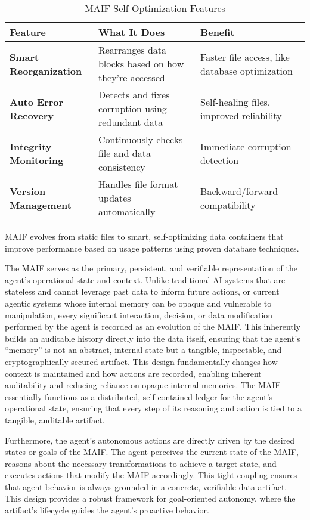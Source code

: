 \documentclass[conference]{IEEEtran}
\begin{document}
\begin{table*}[!t]
\renewcommand{\arraystretch}{1.3}
\caption{MAIF Self-Optimization Features}
\label{tab:self-optimization}
\centering
\footnotesize
\begin{tabular}{p{3.5cm}p{5cm}p{4.5cm}}
\toprule
\textbf{Feature} & \textbf{What It Does} & \textbf{Benefit} \\
\midrule
\textbf{Smart Reorganization} & Rearranges data blocks based on how they're accessed & Faster file access, like database optimization \\
\textbf{Auto Error Recovery} & Detects and fixes corruption using redundant data & Self-healing files, improved reliability \\
\textbf{Integrity Monitoring} & Continuously checks file and data consistency & Immediate corruption detection \\
\textbf{Version Management} & Handles file format updates automatically & Backward/forward compatibility \\
\bottomrule
\end{tabular}
\end{table*}

MAIF evolves from static files to smart, self-optimizing data containers that improve performance based on usage patterns using proven database techniques.

The MAIF serves as the primary, persistent, and verifiable representation of the agent's operational state and context. Unlike traditional AI systems that are stateless and cannot leverage past data to inform future actions, or current agentic systems whose internal memory can be opaque and vulnerable to manipulation\cite{ref1}, every significant interaction, decision, or data modification performed by the agent is recorded as an evolution of the MAIF. This inherently builds an auditable history directly into the data itself, ensuring that the agent's ``memory'' is not an abstract, internal state but a tangible, inspectable, and cryptographically secured artifact. This design fundamentally changes how context is maintained and how actions are recorded, enabling inherent auditability and reducing reliance on opaque internal memories. The MAIF essentially functions as a distributed, self-contained ledger for the agent's operational state, ensuring that every step of its reasoning and action is tied to a tangible, auditable artifact.

Furthermore, the agent's autonomous actions are directly driven by the desired states or goals of the MAIF. The agent perceives the current state of the MAIF, reasons about the necessary transformations to achieve a target state, and executes actions that modify the MAIF accordingly. This tight coupling ensures that agent behavior is always grounded in a concrete, verifiable data artifact. This design provides a robust framework for goal-oriented autonomy, where the artifact's lifecycle guides the agent's proactive behavior.
\end{document}
